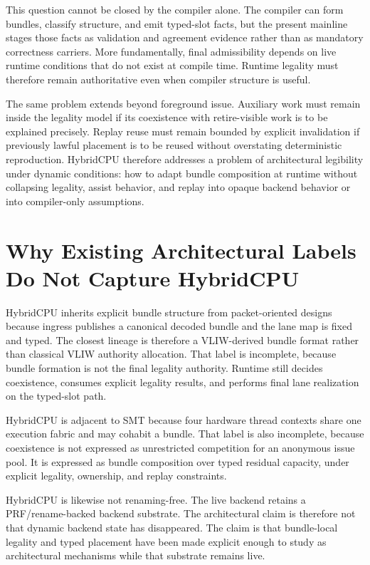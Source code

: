 \documentclass[twocolumn]{article}
\begin{document}
This question cannot be closed by the compiler alone. The compiler can form bundles, classify structure, and emit typed-slot facts, but the present mainline stages those facts as validation and agreement evidence rather than as mandatory correctness carriers. More fundamentally, final admissibility depends on live runtime conditions that do not exist at compile time. Runtime legality must therefore remain authoritative even when compiler structure is useful.

The same problem extends beyond foreground issue. Auxiliary work must remain inside the legality model if its coexistence with retire-visible work is to be explained precisely. Replay reuse must remain bounded by explicit invalidation if previously lawful placement is to be reused without overstating deterministic reproduction. HybridCPU therefore addresses a problem of architectural legibility under dynamic conditions: how to adapt bundle composition at runtime without collapsing legality, assist behavior, and replay into opaque backend behavior or into compiler-only assumptions.


\section{Why Existing Architectural Labels Do Not Capture HybridCPU}

HybridCPU inherits explicit bundle structure from packet-oriented designs because ingress publishes a canonical decoded bundle and the lane map is fixed and typed. The closest lineage is therefore a VLIW-derived bundle format rather than classical VLIW authority allocation. That label is incomplete, because bundle formation is not the final legality authority. Runtime still decides coexistence, consumes explicit legality results, and performs final lane realization on the typed-slot path.

HybridCPU is adjacent to SMT because four hardware thread contexts share one execution fabric and may cohabit a bundle. That label is also incomplete, because coexistence is not expressed as unrestricted competition for an anonymous issue pool. It is expressed as bundle composition over typed residual capacity, under explicit legality, ownership, and replay constraints.

HybridCPU is likewise not renaming-free. The live backend retains a PRF/rename-backed backend substrate. The architectural claim is therefore not that dynamic backend state has disappeared. The claim is that bundle-local legality and typed placement have been made explicit enough to study as architectural mechanisms while that substrate remains live.
\end{document}
